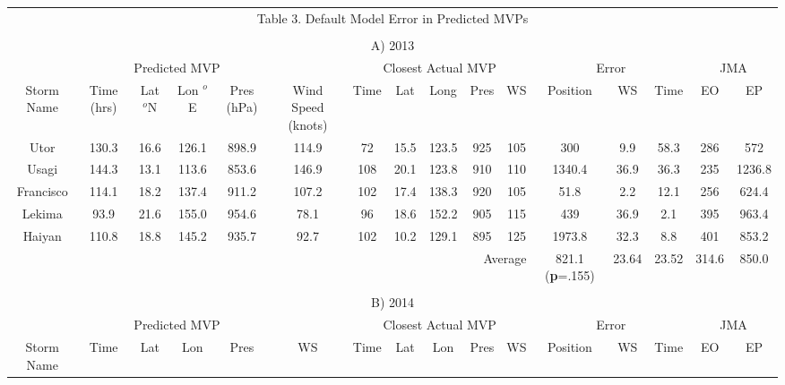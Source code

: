 \documentclass[a4paper, 12pt]{article}
\begin{document}
{\begin{table}[!htpb]
\tiny
\begin{center}
\begin{tabular}{c||c|c|c|c|c||c|c|c|c|c||c|c|c||c|c|}
 \multicolumn{16}{c}{{\small Table 3. Default Model Error in Predicted MVPs}} \\
  \multicolumn{16}{c}{{}} \\
  \multicolumn{16}{c}{{\small A) 2013}}\\\hline
 \multicolumn{6}{|c||}{Predicted MVP} & \multicolumn{5}{|c||}{Closest Actual MVP}& \multicolumn{3}{|c||}{Error} & \multicolumn{2}{|c|}{JMA}\\
\cline{1-16}
\multicolumn{1}{|m{.2in}||}{Storm Name} & \multicolumn{1}{|m{.3in}|}{Time (hrs)} &\multicolumn{1}{|m{.2in}|}{Lat $^o$N}& \multicolumn{1}{|m{.2in}|}{Lon $^o$E}  & \multicolumn{1}{|m{.3in}|}{Pres (hPa)} &  \multicolumn{1}{|m{.2in}||}{Wind Speed (knots)} & Time & Lat & Long & Pres & WS & Position & WS & Time &   EO &EP  \\\hline
\multicolumn{1}{|c||}{Utor} & 130.3 & 16.6 & 126.1 & 898.9 & 114.9 & 72 & 15.5 & 123.5 & 925 & 105 & 300 & 9.9 & 58.3 &286 & 572 \\
\multicolumn{1}{|c||}{Usagi} & 144.3 & 13.1 & 113.6 & 853.6 & 146.9 & 108 & 20.1 & 123.8 & 910 & 110 & 1340.4 & 36.9 & 36.3 & 235  & 1236.8  \\
\multicolumn{1}{|c||}{Francisco} & 114.1 & 18.2 & 137.4 & 911.2 & 107.2 & 102 & 17.4 & 138.3 & 920 & 105 & 51.8 & 2.2 & 12.1 & 256  & 624.4  \\
\multicolumn{1}{|c||}{Lekima} & 93.9 & 21.6 & 155.0 & 954.6 & 78.1 & 96 & 18.6 & 152.2 & 905 & 115 & 439 & 36.9 & 2.1 & 395   & 963.4  \\
\multicolumn{1}{|c||}{Haiyan} & 110.8 & 18.8 & 145.2 & 935.7 & 92.7 &  102 & 10.2 & 129.1 & 895 & 125 & 1973.8 & 32.3 & 8.8 & 401  & 853.2  \\\hline\hline
\multicolumn{11}{|r||}{Average}&\multicolumn{1}{|m{.2in}|}{\vspace{.1in} 821.1 \hspace{.5in} ({\bf p}=.155)} &23.64&23.52&314.6&850.0\\\hline
  \multicolumn{16}{c}{}\\
\multicolumn{16}{c}{{\small B) 2014}} \\\hline
\multicolumn{6}{|c||}{Predicted MVP} & \multicolumn{5}{|c||}{Closest Actual MVP}& \multicolumn{3}{|c|}{Error} & \multicolumn{2}{||c|}{JMA}\\\hline
\multicolumn{1}{|m{.2in}||}{Storm Name} & Time & Lat & Lon & Pres & WS & Time & Lat & Lon & Pres & WS & Position & WS & Time & EO & EP \\

\end{tabular}
\end{center}
\end{table}}
\end{document}
